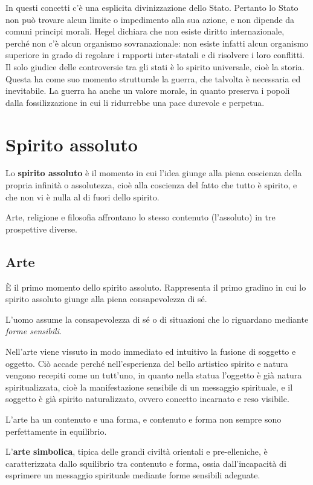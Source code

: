 \documentclass[a4paper, twoside, titlepage]{book}
\begin{document}
In questi concetti c'è una esplicita divinizzazione dello Stato. Pertanto lo Stato non può trovare alcun limite o impedimento alla sua azione, e non dipende da comuni principi morali.
Hegel dichiara che non esiste diritto internazionale, perché non c'è alcun organismo sovranazionale: non esiste infatti alcun organismo superiore in grado di regolare i rapporti inter-statali e di risolvere i loro conflitti.
Il solo giudice delle controversie tra gli stati è lo spirito universale, cioè la storia. Questa ha come suo momento strutturale la guerra, che talvolta è necessaria ed inevitabile.
La guerra ha anche un valore morale, in quanto preserva i popoli dalla fossilizzazione in cui li ridurrebbe una pace durevole e perpetua.

\section{Spirito assoluto}

Lo \textbf{spirito assoluto} è il momento in cui l'idea giunge alla piena coscienza della propria infinità o assolutezza, cioè alla coscienza del fatto che tutto è spirito, e che non vi è nulla al di fuori dello spirito.

Arte, religione e filosofia affrontano lo stesso contenuto (l’assoluto) in tre prospettive diverse.

\subsection{Arte}

È il primo momento dello spirito assoluto.
Rappresenta il primo gradino in cui lo spirito assoluto giunge alla piena consapevolezza di sé.

L'uomo assume la consapevolezza di sé o di situazioni che lo riguardano mediante \textit{forme sensibili}.

Nell’arte viene vissuto in modo immediato ed intuitivo la fusione di soggetto e oggetto.
Ciò accade perché nell'esperienza del bello artistico spirito e natura vengono recepiti come un tutt'uno, in quanto nella statua l'oggetto è già natura spiritualizzata, cioè la manifestazione sensibile di un messaggio spirituale, e il soggetto è già spirito naturalizzato, ovvero concetto incarnato e reso visibile.

L’arte ha un contenuto e una forma, e contenuto e forma non sempre sono perfettamente in equilibrio.

L'\textbf{arte simbolica}, tipica delle grandi civiltà orientali e pre-elleniche, è caratterizzata dallo squilibrio tra contenuto e forma, ossia dall'incapacità di esprimere un messaggio spirituale mediante forme sensibili adeguate.
\end{document}

